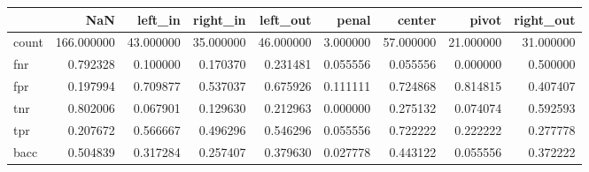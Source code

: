 \begin{tabular}{lrrrrrrrr}
\toprule
{} &         NaN &    left\_in &   right\_in &   left\_out &     penal &     center &      pivot &  right\_out \\
\midrule
count &  166.000000 &  43.000000 &  35.000000 &  46.000000 &  3.000000 &  57.000000 &  21.000000 &  31.000000 \\
fnr   &    0.792328 &   0.100000 &   0.170370 &   0.231481 &  0.055556 &   0.055556 &   0.000000 &   0.500000 \\
fpr   &    0.197994 &   0.709877 &   0.537037 &   0.675926 &  0.111111 &   0.724868 &   0.814815 &   0.407407 \\
tnr   &    0.802006 &   0.067901 &   0.129630 &   0.212963 &  0.000000 &   0.275132 &   0.074074 &   0.592593 \\
tpr   &    0.207672 &   0.566667 &   0.496296 &   0.546296 &  0.055556 &   0.722222 &   0.222222 &   0.277778 \\
bacc  &    0.504839 &   0.317284 &   0.257407 &   0.379630 &  0.027778 &   0.443122 &   0.055556 &   0.372222 \\
\bottomrule
\end{tabular}
